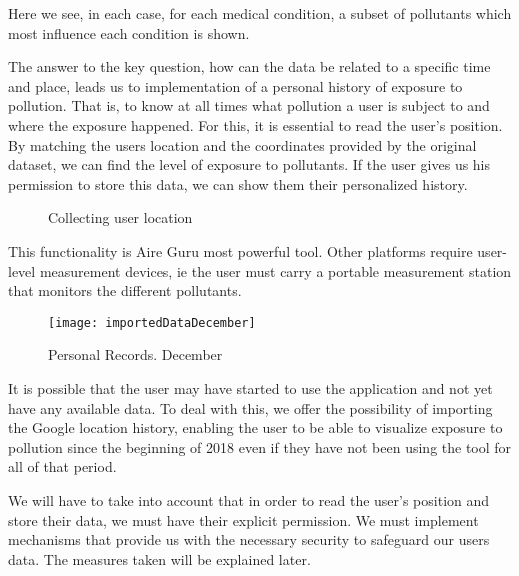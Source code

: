 Here we see, in each case, for each medical condition, a subset of pollutants which most influence each condition is shown.
  
The answer to the key question, how can the data be related to a specific time and place, leads us to
implementation of a personal history of exposure to pollution. That is, to know at all times what pollution
a user is subject to and where the exposure happened.
For this, it is essential to read the user's position. By matching the users location and the coordinates provided by the original dataset, we can find the level of exposure to pollutants.
If the user gives us his permission to store this data, we can show them their personalized history.

\begin{figure}[ht]
  \centering 
    \caption{Collecting user location}
  \end{figure}

  This functionality is Aire Guru most powerful tool. Other platforms require user-level measurement devices, ie the user must carry
  a portable measurement station that monitors the different pollutants. \\

  \begin{figure}[ht]
      \centering
      \texttt{[image: importedDataDecember]}
      \caption{Personal Records. December}
  \end{figure}

It is possible that the user may have started to use the application and not yet have any available data.
To deal with this, we offer the possibility of importing the Google location history, enabling the user to be able to visualize
exposure to pollution since the beginning of 2018 even if they have not been using the tool for  all of that period.

We will have to take into account that in order to read the user's position and store their data, we must
have their explicit permission. We must implement mechanisms that provide us with the necessary security to safeguard our users data. The measures taken will be explained later.

